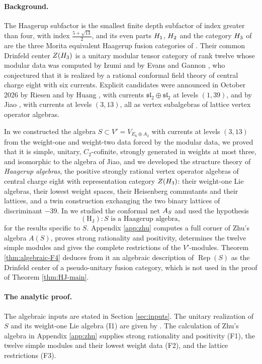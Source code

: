 \documentclass[leqno]{article}
\let\cal\relax
\newcommand{\cal}{\mathcal}
\newcommand{\co}{\colon}
\DeclareMathOperator{\Rep}{Rep}
\numberwithin{equation}{section}
\begin{document}
\paragraph{Background.}
The Haagerup subfactor \cite{Haa94,AsH99} is the smallest finite depth subfactor of index greater than four, with index $\frac{5+\sqrt{13}}2$, and its even parts $\cal H_1$, $\cal H_2$ and the category $\cal H_3$ of \cite[Definition 3.19 p.~23]{GrS12} are the three Morita equivalent Haagerup fusion categories of \cite{GrS12}. Their common Drinfeld center $Z(\cal H_3)$ is a unitary modular tensor category of rank twelve whose modular data was computed by Izumi \cite{Izu01} and by Evans and Gannon \cite{EvG11}, who conjectured that it is realized by a rational conformal field theory of central charge eight with six currents. Explicit candidates were announced in October 2026 by Riesen \cite{Rie26} and by Huang \cite{Hua26}, with currents $\mathfrak{sl}_2 \oplus \mathfrak{sl}_2$ at levels $(1,39)$, and by Jiao \cite{Jia26}, with currents at levels $(3,13)$, all as vertex subalgebras of lattice vertex operator algebras.

In \cite{Arh26} we constructed the algebra $S \subset V' = V_{E_6 \oplus A_2}$ with currents at levels $(3,13)$ from the weight-one and weight-two data forced by the modular data, we proved that it is simple, unitary, $C_2$-cofinite, strongly generated in weights at most three, and isomorphic to the algebra of Jiao, and we developed the structure theory of \emph{Haagerup algebras}, the positive strongly rational vertex operator algebras of central charge eight with representation category $Z(\cal H_3)$: their weight-one Lie algebras, their lowest weight spaces, their Heisenberg commutants and their lattices, and a twin construction exchanging the two binary lattices of discriminant $-39$. In \cite{ArhII} we studied the conformal net $\cal A_S$ and used the hypothesis
\[
\mathrm{(H_J)} \co \text{$S$ is a Haagerup algebra},
\]
for the results specific to $S$. Appendix \ref{app:zhu} computes a full corner of Zhu's algebra $A(S)$, proves strong rationality and positivity, determines the twelve simple modules and gives the complete restrictions of the $V'$-modules. Theorem \ref{thm:algebraic-F4} deduces from it an algebraic description of $\Rep(S)$ as the Drinfeld center of a pseudo-unitary fusion category, which is not used in the proof of Theorem \ref{thm:HJ-main}.

\paragraph{The analytic proof.}
The algebraic inputs are stated in Section \ref{sec:inputs}. The unitary realization of $S$ and its weight-one Lie algebra (I1) are given by \cite[Theorems 10.10 and 10.21]{Arh26}. The calculation of Zhu's algebra in Appendix \ref{app:zhu} supplies strong rationality and positivity (F1), the twelve simple modules and their lowest weight data (F2), and the lattice restrictions (F3).
\end{document}

